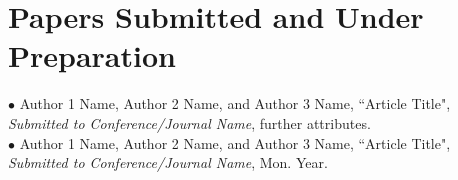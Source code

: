 

%
\chapter*{\thechapter \quad Papers Submitted and Under Preparation}

$\bullet$ Author 1 Name, Author 2 Name, and Author 3 Name, {``Article Title"}, \emph{Submitted to Conference/Journal Name}, further attributes.
\\
$\bullet$ Author 1 Name, Author 2 Name, and Author 3 Name, {``Article Title"}, \emph{Submitted to Conference/Journal Name}, Mon. Year.

